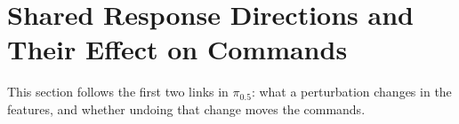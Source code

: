 \section{Shared Response Directions and Their Effect on Commands}
\label{sec:structured}
This section follows the first two links in $\pi_{0.5}$: what a perturbation changes in the features, and whether undoing that change moves the commands.

